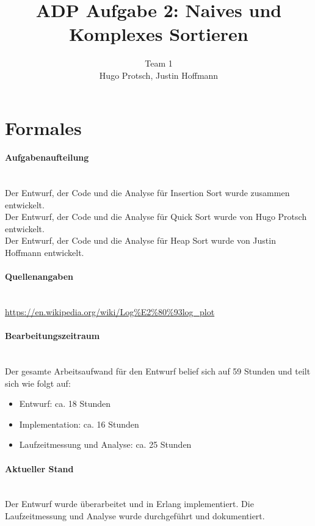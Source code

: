 \documentclass[11pt]{article}
\title{ADP Aufgabe 2: Naives und Komplexes Sortieren}
\author{Team 1\\Hugo Protsch, Justin Hoffmann}
\begin{document}
    \maketitle

    \tableofcontents

    \newpage


    \section{Formales}\label{sec:Formales}

    \paragraph*{Aufgabenaufteilung}\mbox{}\\
    Der Entwurf, der Code und die Analyse für Insertion Sort wurde zusammen
    entwickelt.\\
    Der Entwurf, der Code und die Analyse für Quick Sort wurde von Hugo Protsch
    entwickelt.\\
    Der Entwurf, der Code und die Analyse für Heap Sort wurde von Justin
    Hoffmann entwickelt.

    \paragraph*{Quellenangaben}\mbox{}\\
    \url{https://en.wikipedia.org/wiki/Log%E2%80%93log_plot}

    \paragraph*{Bearbeitungszeitraum}\mbox{}\\
    Der gesamte Arbeitsaufwand für den Entwurf belief sich auf 59 Stunden
    und teilt sich wie folgt auf:
    \begin{itemize}
        \setlength\itemsep{0em}
        \item Entwurf: ca. 18 Stunden
        \item Implementation: ca. 16 Stunden
        \item Laufzeitmessung und Analyse: ca. 25 Stunden
    \end{itemize}

    \paragraph*{Aktueller Stand}\mbox{}\\
    Der Entwurf wurde überarbeitet und in Erlang implementiert. Die
    Laufzeitmessung und Analyse wurde durchgeführt und dokumentiert.
\end{document}
